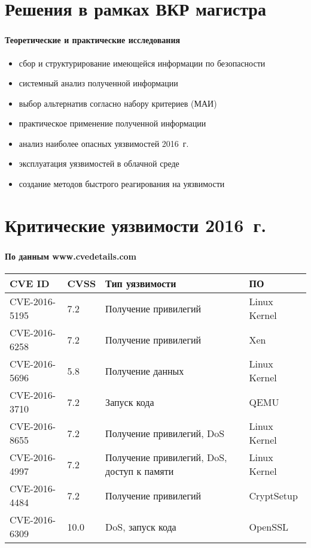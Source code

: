 
\section{Решения в рамках ВКР магистра}

\begin{frame}
\frametitle{\insertsection}
\framesubtitle{Теоретические и практические исследования}

\begin{itemize}
    \item сбор и структурирование имеющейся информации по безопасности
    \item системный анализ полученной информации
    \item выбор альтернатив согласно набору критериев (МАИ)
    \item практическое применение полученной информации
    \item анализ наиболее опасных уязвимостей 2016~г.
    \item эксплуатация уязвимостей в облачной среде
    \item создание методов быстрого реагирования на уязвимости
\end{itemize}
\end{frame}


\section{Критические уязвимости 2016~г.}

\begin{frame}
\frametitle{\insertsection}
\framesubtitle{По данным www.cvedetails.com}

\begin{table}
    \begin{tabular}{|l|l|p{4cm}|l|}
        \hline \textbf{CVE ID} & \textbf{CVSS} & \textbf{Тип уязвимости} & \textbf{ПО} \\
        \hline CVE-2016-5195 & 7.2 & Получение привилегий & Linux Kernel \\
        \hline CVE-2016-6258 & 7.2 & Получение привилегий & Xen \\
        \hline CVE-2016-5696 & 5.8 & Получение данных & Linux Kernel \\
        \hline CVE-2016-3710 & 7.2 & Запуск кода & QEMU \\
        \hline CVE-2016-8655 & 7.2 & Получение привилегий, DoS & Linux Kernel \\
        \hline CVE-2016-4997 & 7.2 & Получение привилегий, DoS, доступ к памяти & Linux Kernel \\
        \hline CVE-2016-4484 & 7.2 & Получение привилегий & CryptSetup \\
        \hline CVE-2016-6309 & 10.0 & DoS, запуск кода & OpenSSL\\
        \hline
    \end{tabular}
\end{table}
\end{frame}


